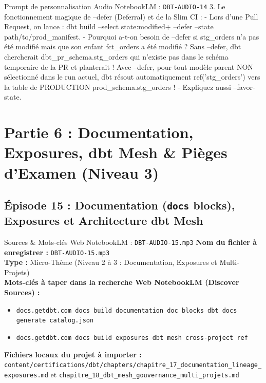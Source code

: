 \documentclass[11pt,a4paper]{article}
\begin{document}
\begin{promptbox}{Prompt de personnalisation Audio NotebookLM : \texttt{DBT-AUDIO-14}}
3. Le fonctionnement magique de --defer (Deferral) et de la Slim CI :
- Lors d'une Pull Request, on lance : dbt build --select state:modified+ --defer --state path/to/prod\_manifest.
- Pourquoi a-t-on besoin de --defer si stg\_orders n'a pas été modifié mais que son enfant fct\_orders a été modifié ?
  Sans --defer, dbt chercherait dbt\_pr\_schema.stg\_orders qui n'existe pas dans le schéma temporaire de la PR et planterait ! Avec --defer, pour tout modèle parent NON sélectionné dans le run actuel, dbt résout automatiquement ref('stg\_orders') vers la table de PRODUCTION prod\_schema.stg\_orders !
- Expliquez aussi --favor-state.
\end{promptbox}

\newpage

\section{Partie 6 : Documentation, Exposures, dbt Mesh \& Pièges d'Examen (Niveau 3)}

\subsection{Épisode 15 : Documentation (\texttt{docs} blocks), Exposures et Architecture dbt Mesh}
\begin{sourcebox}{Sources \& Mots-clés Web NotebookLM : \texttt{DBT-AUDIO-15.mp3}}
\textbf{Nom du fichier à enregistrer :} \texttt{DBT-AUDIO-15.mp3}\\
\textbf{Type :} Micro-Thème (Niveau 2 à 3 : Documentation, Exposures et Multi-Projets)\\
\textbf{Mots-clés à taper dans la recherche Web NotebookLM (Discover Sources) :}
\begin{itemize}[noitemsep]
    \item \texttt{docs.getdbt.com docs build documentation doc blocks dbt docs generate catalog.json}
    \item \texttt{docs.getdbt.com docs build exposures dbt mesh cross-project ref}
\end{itemize}
\textbf{Fichiers locaux du projet à importer :}
\texttt{content/certifications/dbt/chapters/chapitre_17_documentation_lineage_exposures.md} et \texttt{chapitre_18_dbt_mesh_gouvernance_multi_projets.md}
\end{sourcebox}
\end{document}
